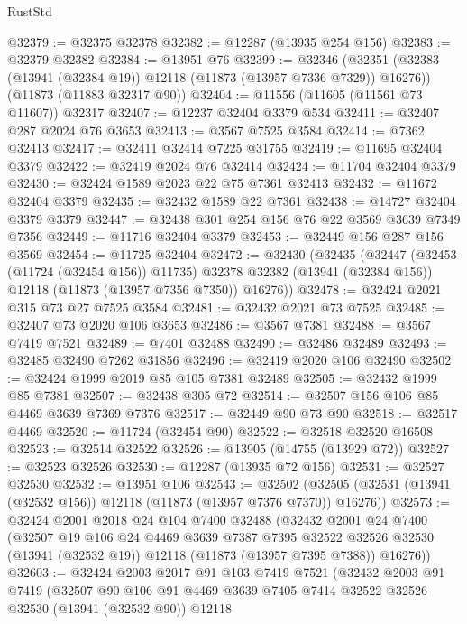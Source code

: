 \begin{lexlean}{RustStd}
\begin{coremodule}
@32379 := @32375 @32378
@32382 := @12287 (@13935 @254 @156)
@32383 := @32379 @32382
@32384 := @13951 @76
@32399 := @32346
    (@32351 (@32383 (@13941 (@32384 @19)) @12118 (@11873 (@13957 @7336 @7329)) @16276))
    (@11873 (@11883 @32317 @90))
@32404 := @11556 (@11605 (@11561 @73 @11607)) @32317
@32407 := @12237 @32404 @3379 @534
@32411 := @32407 @287 @2024 @76 @3653
@32413 := @3567 @7525 @3584
@32414 := @7362 @32413
@32417 := @32411 @32414 @7225 @31755
@32419 := @11695 @32404 @3379
@32422 := @32419 @2024 @76 @32414
@32424 := @11704 @32404 @3379
@32430 := @32424 @1589 @2023 @22 @75 @7361 @32413
@32432 := @11672 @32404 @3379
@32435 := @32432 @1589 @22 @7361
@32438 := @14727 @32404 @3379 @3379
@32447 := @32438 @301 @254 @156 @76 @22 @3569 @3639 @7349 @7356
@32449 := @11716 @32404 @3379
@32453 := @32449 @156 @287 @156 @3569
@32454 := @11725 @32404
@32472 := @32430
    (@32435
      (@32447
        (@32453 (@11724 (@32454 @156)) @11735)
        @32378
        @32382
        (@13941 (@32384 @156))
        @12118
        (@11873 (@13957 @7356 @7350))
        @16276))
@32478 := @32424 @2021 @315 @73 @27 @7525 @3584
@32481 := @32432 @2021 @73 @7525
@32485 := @32407 @73 @2020 @106 @3653
@32486 := @3567 @7381
@32488 := @3567 @7419 @7521
@32489 := @7401 @32488
@32490 := @32486 @32489
@32493 := @32485 @32490 @7262 @31856
@32496 := @32419 @2020 @106 @32490
@32502 := @32424 @1999 @2019 @85 @105 @7381 @32489
@32505 := @32432 @1999 @85 @7381
@32507 := @32438 @305 @72
@32514 := @32507 @156 @106 @85 @4469 @3639 @7369 @7376
@32517 := @32449 @90 @73 @90
@32518 := @32517 @4469
@32520 := @11724 (@32454 @90)
@32522 := @32518 @32520 @16508
@32523 := @32514 @32522
@32526 := @13905 (@14755 (@13929 @72))
@32527 := @32523 @32526
@32530 := @12287 (@13935 @72 @156)
@32531 := @32527 @32530
@32532 := @13951 @106
@32543 := @32502
    (@32505 (@32531 (@13941 (@32532 @156)) @12118 (@11873 (@13957 @7376 @7370)) @16276))
@32573 := @32424
    @2001
    @2018
    @24
    @104
    @7400
    @32488
    (@32432
      @2001
      @24
      @7400
      (@32507
        @19
        @106
        @24
        @4469
        @3639
        @7387
        @7395
        @32522
        @32526
        @32530
        (@13941 (@32532 @19))
        @12118
        (@11873 (@13957 @7395 @7388))
        @16276))
@32603 := @32424
    @2003
    @2017
    @91
    @103
    @7419
    @7521
    (@32432
      @2003
      @91
      @7419
      (@32507
        @90
        @106
        @91
        @4469
        @3639
        @7405
        @7414
        @32522
        @32526
        @32530
        (@13941 (@32532 @90))
        @12118

\end{coremodule}
\end{lexlean}
